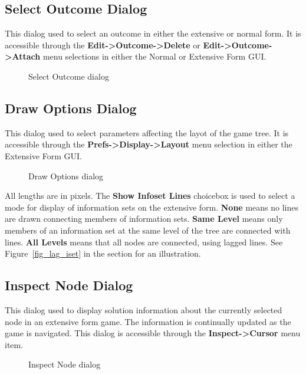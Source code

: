 \documentclass[12pt]{report}
\begin{document}
\subsection{Select Outcome Dialog}\label{SelectOutcome}

This dialog used to select an outcome in either the extensive or
normal form. It is accessible through the {\bf Edit->Outcome->Delete} or 
{\bf Edit->Outcome->Attach} menu selections in either the Normal or
Extensive Form GUI. 

\begin{figure}
\caption{Select Outcome dialog}\label{fig_selectout}
\end{figure}

\subsection{Draw Options Dialog}\label{DrawOptions}

This dialog used to select parameters affecting the layot of the game
tree.  It is accessible through the {\bf Prefs->Display->Layout} menu
selection in either the Extensive Form GUI.

\begin{figure}
\caption{Draw Options dialog}\label{fig_drawopts}
\end{figure}

All lengths are in pixels.  The {\bf Show Infoset Lines} choicebox is used
to select a mode for display of information sets on the extensive
form.  {\bf None} means no lines are drawn connecting members of
information sets.  {\bf Same Level} means only members of an
information set at the same level of the tree are connected with
lines.  {\bf All Levels} means that all nodes are connected, using
lagged lines.  See Figure~\ref{fig_lag_iset} in the  section for an illustration.

\subsection{Inspect Node Dialog}\label{InspectNode}

This dialog used to display solution information about the currently
selected node in an extensive form game.  The information is
continually updated as the game is navigated.  This dialog is
accessible through the {\bf Inspect->Cursor} menu item.  

\begin{figure}
\caption{Inspect Node dialog}\label{fig_inspectnode}
\end{figure}
\end{document}
